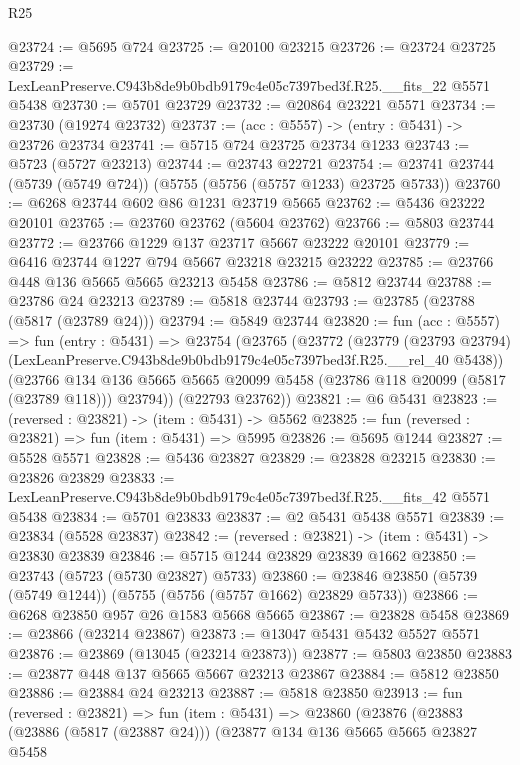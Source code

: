 \begin{lexlean}{R25}
\begin{coremodule}
@23724 := @5695 @724
@23725 := @20100 @23215
@23726 := @23724 @23725
@23729 := LexLeanPreserve.C943b8de9b0bdb9179c4e05c7397bed3f.R25.__fits_22 @5571 @5438
@23730 := @5701 @23729
@23732 := @20864 @23221 @5571
@23734 := @23730 (@19274 @23732)
@23737 := (acc : @5557) -> (entry : @5431) -> @23726 @23734
@23741 := @5715 @724 @23725 @23734 @1233
@23743 := @5723 (@5727 @23213)
@23744 := @23743 @22721
@23754 := @23741 @23744 (@5739 (@5749 @724)) (@5755 (@5756 (@5757 @1233) @23725 @5733))
@23760 := @6268 @23744 @602 @86 @1231 @23719 @5665
@23762 := @5436 @23222 @20101
@23765 := @23760 @23762 (@5604 @23762)
@23766 := @5803 @23744
@23772 := @23766 @1229 @137 @23717 @5667 @23222 @20101
@23779 := @6416 @23744 @1227 @794 @5667 @23218 @23215 @23222
@23785 := @23766 @448 @136 @5665 @5665 @23213 @5458
@23786 := @5812 @23744
@23788 := @23786 @24 @23213
@23789 := @5818 @23744
@23793 := @23785 (@23788 (@5817 (@23789 @24)))
@23794 := @5849 @23744
@23820 := fun (acc : @5557) =>
  fun (entry : @5431) =>
  @23754
    (@23765
      (@23772
        (@23779
          (@23793 @23794)
          (LexLeanPreserve.C943b8de9b0bdb9179c4e05c7397bed3f.R25.__rel_40 @5438))
        (@23766
          @134
          @136
          @5665
          @5665
          @20099
          @5458
          (@23786 @118 @20099 (@5817 (@23789 @118)))
          @23794))
      (@22793 @23762))
@23821 := @6 @5431
@23823 := (reversed : @23821) -> (item : @5431) -> @5562
@23825 := fun (reversed : @23821) => fun (item : @5431) => @5995
@23826 := @5695 @1244
@23827 := @5528 @5571
@23828 := @5436 @23827
@23829 := @23828 @23215
@23830 := @23826 @23829
@23833 := LexLeanPreserve.C943b8de9b0bdb9179c4e05c7397bed3f.R25.__fits_42 @5571 @5438
@23834 := @5701 @23833
@23837 := @2 @5431 @5438 @5571
@23839 := @23834 (@5528 @23837)
@23842 := (reversed : @23821) -> (item : @5431) -> @23830 @23839
@23846 := @5715 @1244 @23829 @23839 @1662
@23850 := @23743 (@5723 (@5730 @23827) @5733)
@23860 := @23846 @23850 (@5739 (@5749 @1244)) (@5755 (@5756 (@5757 @1662) @23829 @5733))
@23866 := @6268 @23850 @957 @26 @1583 @5668 @5665
@23867 := @23828 @5458
@23869 := @23866 (@23214 @23867)
@23873 := @13047 @5431 @5432 @5527 @5571
@23876 := @23869 (@13045 (@23214 @23873))
@23877 := @5803 @23850
@23883 := @23877 @448 @137 @5665 @5667 @23213 @23867
@23884 := @5812 @23850
@23886 := @23884 @24 @23213
@23887 := @5818 @23850
@23913 := fun (reversed : @23821) =>
  fun (item : @5431) =>
  @23860
    (@23876
      (@23883
        (@23886 (@5817 (@23887 @24)))
        (@23877
          @134
          @136
          @5665
          @5665
          @23827
          @5458

\end{coremodule}
\end{lexlean}
